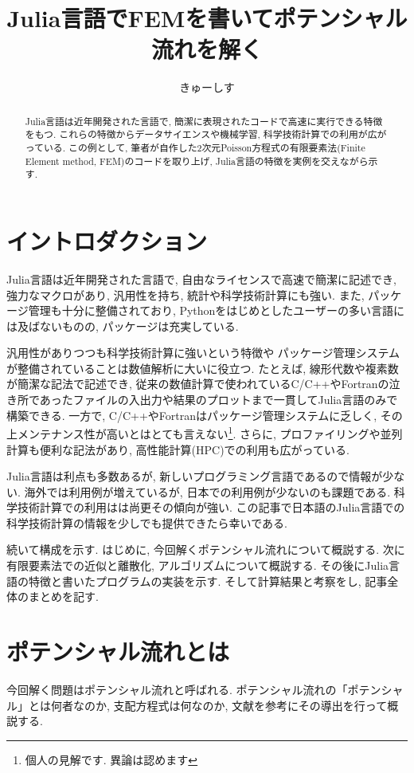 \documentclass{ltjsarticle}
\begin{document}
\title{Julia言語でFEMを書いてポテンシャル流れを解く}
\author{きゅーしす}
\maketitle
\begin{abstract}
    Julia言語は近年開発された言語で, 簡潔に表現されたコードで高速に実行できる特徴をもつ. 
    これらの特徴からデータサイエンスや機械学習, 科学技術計算での利用が広がっている. 
    この例として, 筆者が自作した2次元Poisson方程式の有限要素法(Finite Element method, FEM)のコードを取り上げ, 
    Julia言語の特徴を実例を交えながら示す. 
\end{abstract}


\section{イントロダクション}
Julia言語は近年開発された言語で, 自由なライセンスで高速で簡潔に記述でき, 
強力なマクロがあり, 汎用性を持ち, 統計や科学技術計算にも強い\cite{Bezanson2012}. 
また, パッケージ管理も十分に整備されており, 
Pythonをはじめとしたユーザーの多い言語には及ばないものの, パッケージは充実している. 

汎用性がありつつも科学技術計算に強いという特徴や
パッケージ管理システムが整備されていることは数値解析に大いに役立つ.
たとえば, 線形代数や複素数が簡潔な記法で記述でき, 
従来の数値計算で使われているC/C++やFortranの泣き所であったファイルの入出力や結果のプロットまで一貫してJulia言語のみで構築できる.
一方で, C/C++やFortranはパッケージ管理システムに乏しく, 
その上メンテナンス性が高いとはとても言えない\footnote{個人の見解です. 異論は認めます}. 
さらに, プロファイリングや並列計算も便利な記法があり, 高性能計算(HPC)での利用も広がっている.

Julia言語は利点も多数あるが, 新しいプログラミング言語であるので情報が少ない. 
海外では利用例が増えているが, 日本での利用例が少ないのも課題である. 
科学技術計算での利用はは尚更その傾向が強い. 
この記事で日本語のJulia言語での科学技術計算の情報を少しでも提供できたら幸いである. 

続いて構成を示す. 
はじめに, 今回解くポテンシャル流れについて概説する. 
次に有限要素法での近似と離散化, アルゴリズムについて概説する. 
その後にJulia言語の特徴と書いたプログラムの実装を示す. 
そして計算結果と考察をし, 記事全体のまとめを記す. 

\section{ポテンシャル流れとは}
今回解く問題はポテンシャル流れと呼ばれる. 
ポテンシャル流れの「ポテンシャル」とは何者なのか, 
支配方程式は何なのか,
文献\cite{Kanbe1995}を参考にその導出を行って概説する. 
\end{document}

